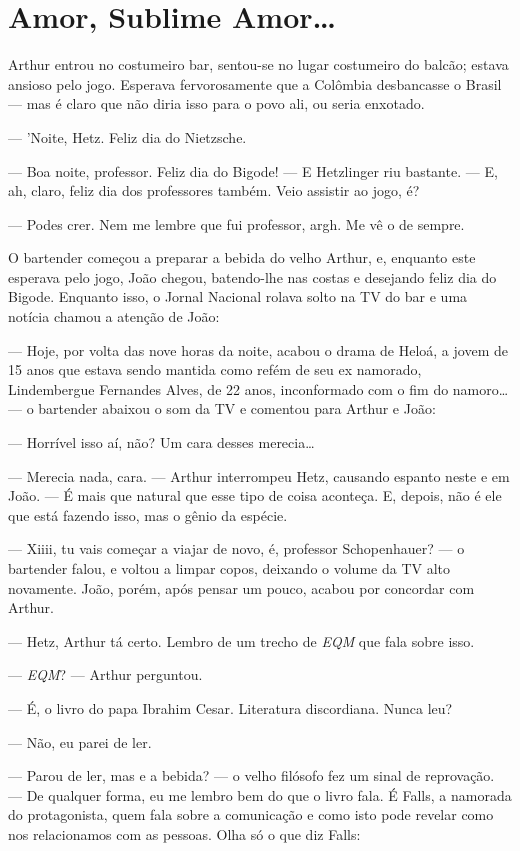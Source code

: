 \chapter{Amor, Sublime Amor\ldots}

Arthur entrou no costumeiro bar, sentou-se no lugar costumeiro do balcão; estava ansioso pelo jogo. Esperava fervorosamente que a Colômbia desbancasse o Brasil --- mas é claro que não diria isso para o povo ali, ou seria enxotado.

--- 'Noite, Hetz. Feliz dia do Nietzsche.

--- Boa noite, professor. Feliz dia do Bigode! --- E Hetzlinger riu bastante. --- E, ah, claro, feliz dia dos professores também. Veio assistir ao jogo, é?

--- Podes crer. Nem me lembre que fui professor, argh. Me vê o de sempre.

O bartender começou a preparar a bebida do velho Arthur, e, enquanto este esperava pelo jogo, João chegou, batendo-lhe nas costas e desejando feliz dia do Bigode. Enquanto isso, o Jornal Nacional rolava solto na TV do bar e uma notícia chamou a atenção de João:

--- Hoje, por volta das nove horas da noite, acabou o drama de Heloá, a jovem de 15 anos que estava sendo mantida como refém de seu ex namorado, Lindembergue Fernandes Alves, de 22 anos, inconformado com o fim do namoro\ldots --- o bartender abaixou o som da TV e comentou para Arthur e João:

--- Horrível isso aí, não? Um cara desses merecia\ldots

--- Merecia nada, cara. --- Arthur interrompeu Hetz, causando espanto neste e em João. --- É mais que natural que esse tipo de coisa aconteça. E, depois, não é ele que está fazendo isso, mas o gênio da espécie.

--- Xiiii, tu vais começar a viajar de novo, é, professor Schopenhauer? --- o bartender falou, e voltou a limpar copos, deixando o volume da TV alto novamente. João, porém, após pensar um pouco, acabou por concordar com Arthur.

--- Hetz, Arthur tá certo. Lembro de um trecho de \emph{EQM} que fala sobre isso.

--- \emph{EQM}? --- Arthur perguntou.

--- É, o livro do papa Ibrahim Cesar. Literatura discordiana. Nunca leu?

--- Não, eu parei de ler.

--- Parou de ler, mas e a bebida? --- o velho filósofo fez um sinal de reprovação. --- De qualquer forma, eu me lembro bem do que o livro fala. É Falls, a namorada do protagonista, quem fala sobre a comunicação e como isto pode revelar como nos relacionamos com as pessoas. Olha só o que diz Falls:

